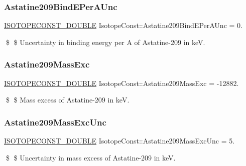\subsubsection{\texorpdfstring{Astatine209\+Bind\+E\+Per\+A\+Unc}{Astatine209BindEPerAUnc}}
{\footnotesize\ttfamily \mbox{\hyperlink{group___isotope_const-_macros_ga8f45a7272ce02c0b4c65c44636ed719a}{I\+S\+O\+T\+O\+P\+E\+C\+O\+N\+S\+T\+\_\+\+D\+O\+U\+B\+LE}} Isotope\+Const\+::\+Astatine209\+Bind\+E\+Per\+A\+Unc = 0.}

\$ \$ Uncertainty in binding energy per A of Astatine-\/209 in keV. \mbox{\label{group___isotope_const-_astatine-_at209_gabd0e051979987c3f0561f8b13658cabf}} 
\subsubsection{\texorpdfstring{Astatine209\+Mass\+Exc}{Astatine209MassExc}}
{\footnotesize\ttfamily \mbox{\hyperlink{group___isotope_const-_macros_ga8f45a7272ce02c0b4c65c44636ed719a}{I\+S\+O\+T\+O\+P\+E\+C\+O\+N\+S\+T\+\_\+\+D\+O\+U\+B\+LE}} Isotope\+Const\+::\+Astatine209\+Mass\+Exc = -\/12882.}

\$ \$ Mass excess of Astatine-\/209 in keV. \mbox{\label{group___isotope_const-_astatine-_at209_ga84def1ed5330f9523f65525cc899e6a8}} 
\subsubsection{\texorpdfstring{Astatine209\+Mass\+Exc\+Unc}{Astatine209MassExcUnc}}
{\footnotesize\ttfamily \mbox{\hyperlink{group___isotope_const-_macros_ga8f45a7272ce02c0b4c65c44636ed719a}{I\+S\+O\+T\+O\+P\+E\+C\+O\+N\+S\+T\+\_\+\+D\+O\+U\+B\+LE}} Isotope\+Const\+::\+Astatine209\+Mass\+Exc\+Unc = 5.}

\$ \$ Uncertainty in mass excess of Astatine-\/209 in keV. \mbox{\label{group___isotope_const-_astatine-_at209_ga20a5cccc40f99f917a92238556ff379f}} 
